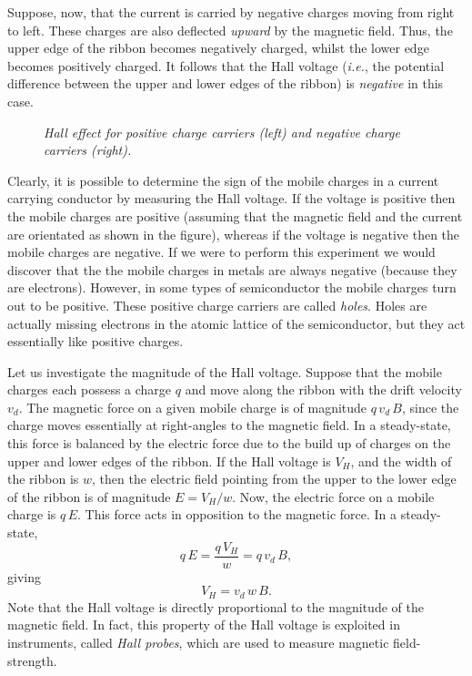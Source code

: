 Suppose, now, that the current is carried by negative charges
moving from right to left. These
charges are also deflected {\em upward}\/ by the magnetic field. Thus, the upper edge
of the ribbon becomes negatively charged, whilst the lower edge becomes
positively charged. It follows that the Hall voltage ({\em i.e.}, the
potential difference between the upper and lower edges of the ribbon)
is {\em negative}\/ in this case.

\begin{figure}
\epsfysize=2in
\centerline{}
\caption{\em Hall effect for positive charge carriers (left) and negative
charge carriers (right).}\label{f8.7}
\end{figure}

Clearly, it is possible to determine the sign of the mobile charges in a
current carrying conductor by measuring the Hall voltage. If the voltage is
positive then the mobile charges are positive (assuming that the
magnetic field and the current are orientated as shown in the
figure), whereas if the voltage is
negative then the mobile charges are negative. If we were to perform
this experiment we would discover that the the mobile charges in metals
are always negative (because they
are electrons). However, in some types of semiconductor the mobile charges
turn out to be positive. These positive charge carriers are called {\em holes}.
Holes are actually  missing electrons in the atomic lattice  of the
semiconductor, but they act essentially like positive charges. 

Let us investigate the magnitude of the Hall voltage. Suppose that the mobile
charges each possess a charge $q$ and move along the ribbon with the
drift velocity $v_d$. The magnetic force on a given mobile charge
is of magnitude $q\,v_d\,B$, since the charge moves essentially
at right-angles to the magnetic field. In a steady-state, this force
is balanced by the electric force due to the build up of charges
on the upper and lower edges of the ribbon. If the Hall voltage is
$V_H$, and the width of the ribbon is $w$, then the electric
field pointing from the upper to the lower edge of the ribbon is
of magnitude $E= V_H/w$. Now, the electric force on a mobile charge
is $q\,E$. This force acts in opposition to the magnetic force. 
In a steady-state,
\begin{equation}
q\,E = \frac{q\,V_H}{w} = q\,v_d\,B,
\end{equation}
giving
\begin{equation}\label{e8.20}
V_H = v_d\,w\,B.
\end{equation}
Note that the Hall voltage is directly proportional to the magnitude of the
magnetic field. In fact, this property of the
Hall voltage  is exploited  in instruments, called {\em Hall probes},
which are used 
to measure magnetic field-strength. 

